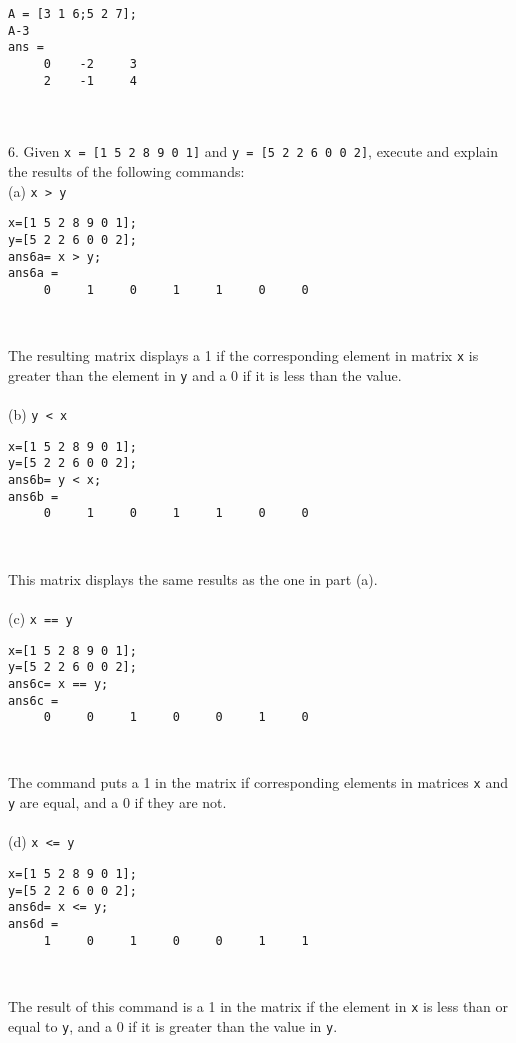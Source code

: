 \documentclass [12pt] {article}
\begin{document}
\indent \begin{Verbatim}[xleftmargin=.5in]
A = [3 1 6;5 2 7];
A-3
ans =
     0    -2     3
     2    -1     4
\end{Verbatim}\\\\
6. Given \verb|x = [1 5 2 8 9 0 1]| and \verb|y = [5 2 2 6 0 0 2]|, execute and explain the results
of the following commands:
\\\indent(a) \verb|x > y|
\indent \begin{Verbatim}[xleftmargin=.5in]
x=[1 5 2 8 9 0 1]; 
y=[5 2 2 6 0 0 2];
ans6a= x > y;
ans6a =
     0     1     0     1     1     0     0
\end{Verbatim}
\\ \par The resulting matrix displays a 1 if the corresponding element in matrix \verb|x| is greater than the element in \verb|y| and a 0 if it is less than the value. \\  
\\\indent(b) \verb|y < x|
\indent \begin{Verbatim}[xleftmargin=.5in]
x=[1 5 2 8 9 0 1]; 
y=[5 2 2 6 0 0 2];
ans6b= y < x;
ans6b =
     0     1     0     1     1     0     0
\end{Verbatim}
\\\par This matrix displays the same results as the one in part (a). \\
\\\indent(c) \verb|x == y|
\indent \begin{Verbatim}[xleftmargin=.5in]
x=[1 5 2 8 9 0 1]; 
y=[5 2 2 6 0 0 2];
ans6c= x == y;
ans6c =
     0     0     1     0     0     1     0
\end{Verbatim}
\\\par The command puts a 1 in the matrix if corresponding elements in matrices \verb|x| and \verb|y| are equal, and a 0 if they are not. \\\newpage
\\\indent(d) \verb|x <= y|
\indent \begin{Verbatim}[xleftmargin=.5in]
x=[1 5 2 8 9 0 1]; 
y=[5 2 2 6 0 0 2];
ans6d= x <= y;
ans6d =
     1     0     1     0     0     1     1
\end{Verbatim}
\\\par The result of this command is a 1 in the matrix if the element in \verb|x| is less than or equal to \verb|y|, and a 0 if it is greater than the value in \verb|y|. \\
\end{document}
